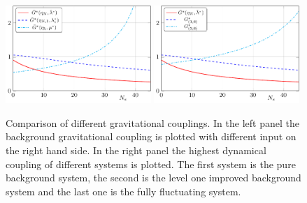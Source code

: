 \documentclass[11pt]{book} %
\begin{document}
{\begin{figure}[!ht]
\includegraphics[width=0.49\textwidth]{Background-g-comparison}
\hfill
\includegraphics[width=0.49\textwidth]{Fluctuation-g-comparison}
\caption{Comparison of different gravitational couplings.
In the left panel the background gravitational coupling is plotted with different input on the right hand side.
In the right panel the highest dynamical coupling of different systems is plotted.
The first system is the pure background system, the second is the level one improved background system and the last one is the fully fluctuating system.}
\label{fig:Comparison-of-g}
\end{figure}

}
\end{document}
